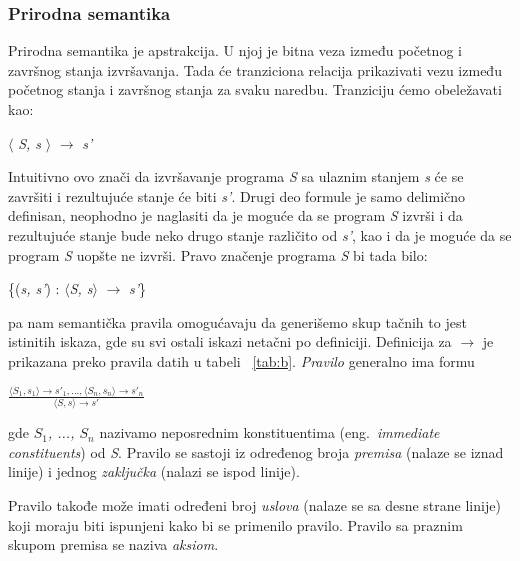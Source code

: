 \documentclass[a4paper]{article}
\begin{document}
{\subsubsection{Prirodna semantika}

\qquad Prirodna semantika je apstrakcija. U njoj je bitna veza između početnog i završnog stanja izvršavanja. Tada će tranziciona relacija prikazivati vezu između početnog stanja i završnog stanja za svaku naredbu. Tranziciju ćemo obeležavati kao:

\begin{center}$\langle$ \textit{S, s} $\rangle$ $\rightarrow$ \textit{s'} \end{center}
Intuitivno ovo znači da izvršavanje programa \textit{S} sa ulaznim stanjem \textit{s} će se završiti i rezultujuće stanje će biti \textit{s'}. Drugi deo formule je samo delimično definisan, neophodno je naglasiti da je moguće da se program \textit{S} izvrši i da rezultujuće stanje bude neko drugo stanje različito od \textit{s'}, kao i da je moguće da se program \textit{S} uopšte ne izvrši. Pravo značenje programa \textit{S} bi tada bilo:
\begin{center}\{(\textit{s, s'}) : $\langle$\textit{S, s}$\rangle$ $\rightarrow$ \textit{s'}\} \end{center} 
pa nam semantička pravila omogućavaju da generišemo skup tačnih to jest istinitih iskaza, gde su svi ostali iskazi netačni po definiciji.\cite{opersem}
Definicija za $\rightarrow$ je prikazana preko pravila datih u tabeli ~\ref{tab:b}. \textit{Pravilo} generalno ima formu

{\large \begin{center}$\frac{\langle S_1, s_1 \rangle \rightarrow s'_1, ... , \langle S_n, s_n \rangle \rightarrow s'_n}{\langle S, s \rangle \rightarrow s'}$ \end{center}}

gde \textit{$S_1$, ..., $S_n$} nazivamo neposrednim konstituentima (eng.~{\em immediate constituents}) od \textit{S}. Pravilo se sastoji iz određenog broja \textit{premisa} (nalaze se iznad linije) i jednog \textit{zaključka} (nalazi se ispod linije).

Pravilo takođe može imati određeni broj \textit{uslova} (nalaze se sa desne strane linije) koji moraju biti ispunjeni kako bi se primenilo pravilo. Pravilo sa praznim skupom premisa se naziva \textit{aksiom}. \cite{wiley}

}
\end{document}
